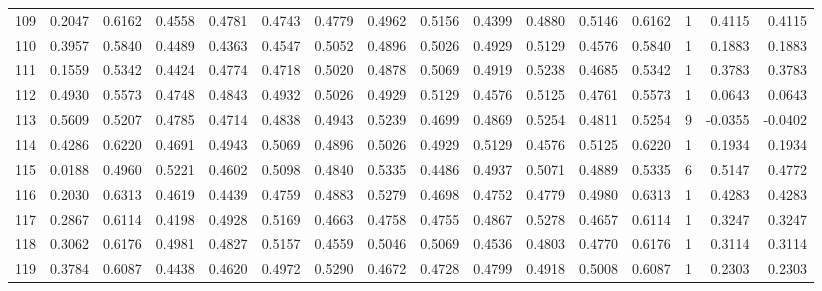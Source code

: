 \begin{tabular}{lrrrrrrrrrrrrrrr}
109 &      0.2047 &  0.6162 &  0.4558 &  0.4781 &  0.4743 &  0.4779 &  0.4962 &  0.5156 &  0.4399 &  0.4880 &   0.5146 &     0.6162 &      1 &                    0.4115 &                     0.4115 \\
110 &      0.3957 &  0.5840 &  0.4489 &  0.4363 &  0.4547 &  0.5052 &  0.4896 &  0.5026 &  0.4929 &  0.5129 &   0.4576 &     0.5840 &      1 &                    0.1883 &                     0.1883 \\
111 &      0.1559 &  0.5342 &  0.4424 &  0.4774 &  0.4718 &  0.5020 &  0.4878 &  0.5069 &  0.4919 &  0.5238 &   0.4685 &     0.5342 &      1 &                    0.3783 &                     0.3783 \\
112 &      0.4930 &  0.5573 &  0.4748 &  0.4843 &  0.4932 &  0.5026 &  0.4929 &  0.5129 &  0.4576 &  0.5125 &   0.4761 &     0.5573 &      1 &                    0.0643 &                     0.0643 \\
113 &      0.5609 &  0.5207 &  0.4785 &  0.4714 &  0.4838 &  0.4943 &  0.5239 &  0.4699 &  0.4869 &  0.5254 &   0.4811 &     0.5254 &      9 &                   -0.0355 &                    -0.0402 \\
114 &      0.4286 &  0.6220 &  0.4691 &  0.4943 &  0.5069 &  0.4896 &  0.5026 &  0.4929 &  0.5129 &  0.4576 &   0.5125 &     0.6220 &      1 &                    0.1934 &                     0.1934 \\
115 &      0.0188 &  0.4960 &  0.5221 &  0.4602 &  0.5098 &  0.4840 &  0.5335 &  0.4486 &  0.4937 &  0.5071 &   0.4889 &     0.5335 &      6 &                    0.5147 &                     0.4772 \\
116 &      0.2030 &  0.6313 &  0.4619 &  0.4439 &  0.4759 &  0.4883 &  0.5279 &  0.4698 &  0.4752 &  0.4779 &   0.4980 &     0.6313 &      1 &                    0.4283 &                     0.4283 \\
117 &      0.2867 &  0.6114 &  0.4198 &  0.4928 &  0.5169 &  0.4663 &  0.4758 &  0.4755 &  0.4867 &  0.5278 &   0.4657 &     0.6114 &      1 &                    0.3247 &                     0.3247 \\
118 &      0.3062 &  0.6176 &  0.4981 &  0.4827 &  0.5157 &  0.4559 &  0.5046 &  0.5069 &  0.4536 &  0.4803 &   0.4770 &     0.6176 &      1 &                    0.3114 &                     0.3114 \\
119 &      0.3784 &  0.6087 &  0.4438 &  0.4620 &  0.4972 &  0.5290 &  0.4672 &  0.4728 &  0.4799 &  0.4918 &   0.5008 &     0.6087 &      1 &                    0.2303 &                     0.2303 \\

\end{tabular}
